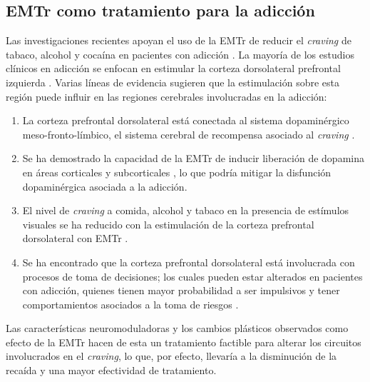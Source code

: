 \subsection{EMTr como tratamiento para la adicción}
Las investigaciones recientes apoyan el uso de la EMTr de reducir el \textit{craving} de tabaco, alcohol y cocaína en pacientes con adicción \parencite{Barr2011}.
La mayoría de los estudios clínicos en adicción se enfocan en estimular la corteza dorsolateral prefrontal izquierda \parencite{Bellamoli2014a,Barr2011,Ekhtiari2019}.
Varias líneas de evidencia sugieren que la estimulación sobre esta región puede influir en las regiones cerebrales involucradas en la adicción:
\begin{enumerate}
    \item La corteza prefrontal dorsolateral está conectada al sistema dopaminérgico meso-fronto-límbico, el sistema cerebral de recompensa asociado al \textit{craving} \parencite{Barr2011}.
    \item Se ha demostrado la capacidad de la EMTr de inducir liberación de dopamina en áreas corticales y subcorticales \parencite{Cho2009,Strafella2001}, lo que podría mitigar la disfunción dopaminérgica asociada a la adicción.
    \item El nivel de \textit{craving} a comida, alcohol y tabaco en la presencia de estímulos visuales se ha reducido con la estimulación de la corteza prefrontal dorsolateral con EMTr \parencite{Amiaz2009}.
    \item Se ha encontrado que la corteza prefrontal dorsolateral está involucrada con procesos de toma de decisiones; los cuales pueden estar alterados en pacientes con adicción, quienes tienen mayor probabilidad a ser impulsivos y tener comportamientos asociados a la toma de riesgos \parencite{Barr2011}.
\end{enumerate}
Las características neuromoduladoras y los cambios plásticos observados como efecto de la EMTr hacen de esta un tratamiento factible para alterar los circuitos involucrados en el \textit{craving}, lo que, por efecto, llevaría a la disminución de la recaída y una mayor efectividad de tratamiento.

